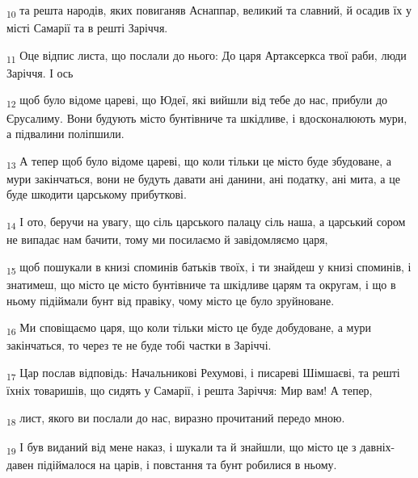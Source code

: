\begin{tcolorbox}
\textsubscript{10} та решта народів, яких повиганяв Аснаппар, великий та славний, й осадив їх у місті Самарії та в решті Заріччя.
\end{tcolorbox}
\begin{tcolorbox}
\textsubscript{11} Оце відпис листа, що послали до нього: До царя Артаксеркса твої раби, люди Заріччя. І ось
\end{tcolorbox}
\begin{tcolorbox}
\textsubscript{12} щоб було відоме цареві, що Юдеї, які вийшли від тебе до нас, прибули до Єрусалиму. Вони будують місто бунтівниче та шкідливе, і вдосконалюють мури, а підвалини поліпшили.
\end{tcolorbox}
\begin{tcolorbox}
\textsubscript{13} А тепер щоб було відоме цареві, що коли тільки це місто буде збудоване, а мури закінчаться, вони не будуть давати ані данини, ані податку, ані мита, а це буде шкодити царському прибуткові.
\end{tcolorbox}
\begin{tcolorbox}
\textsubscript{14} І ото, беручи на увагу, що сіль царського палацу сіль наша, а царський сором не випадає нам бачити, тому ми посилаємо й завідомляємо царя,
\end{tcolorbox}
\begin{tcolorbox}
\textsubscript{15} щоб пошукали в книзі споминів батьків твоїх, і ти знайдеш у книзі споминів, і знатимеш, що місто це місто бунтівниче та шкідливе царям та округам, і що в ньому підіймали бунт від правіку, чому місто це було зруйноване.
\end{tcolorbox}
\begin{tcolorbox}
\textsubscript{16} Ми сповіщаємо царя, що коли тільки місто це буде добудоване, а мури закінчаться, то через те не буде тобі частки в Заріччі.
\end{tcolorbox}
\begin{tcolorbox}
\textsubscript{17} Цар послав відповідь: Начальникові Рехумові, і писареві Шімшаєві, та решті їхніх товаришів, що сидять у Самарії, і решта Заріччя: Мир вам! А тепер,
\end{tcolorbox}
\begin{tcolorbox}
\textsubscript{18} лист, якого ви послали до нас, виразно прочитаний передо мною.
\end{tcolorbox}
\begin{tcolorbox}
\textsubscript{19} І був виданий від мене наказ, і шукали та й знайшли, що місто це з давніх-давен підіймалося на царів, і повстання та бунт робилися в ньому.
\end{tcolorbox}
